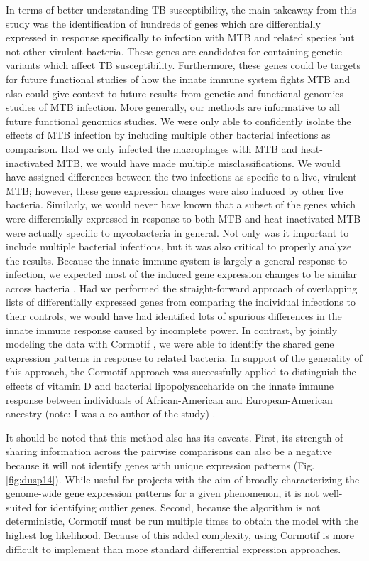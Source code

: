 In terms of better understanding TB susceptibility, the main takeaway from this
study was the identification of hundreds of genes which are differentially
expressed in response specifically to infection with MTB and related species but
not other virulent bacteria. These genes are candidates for containing genetic
variants which affect TB susceptibility. Furthermore, these genes could be
targets for future functional studies of how the innate immune system fights MTB
and also could give context to future results from genetic and functional
genomics studies of MTB infection. More generally, our methods are informative
to all future functional genomics studies. We were only able to confidently
isolate the effects of MTB infection by including multiple other bacterial
infections as comparison. Had we only infected the macrophages with MTB and
heat-inactivated MTB, we would have made multiple misclassifications. We would
have assigned differences between the two infections as specific to a live,
virulent MTB; however, these gene expression changes were also induced by other
live bacteria. Similarly, we would never have known that a subset of the genes
which were differentially expressed in response to both MTB and heat-inactivated
MTB were actually specific to mycobacteria in general. Not only was it important
to include multiple bacterial infections, but it was also critical to properly
analyze the results. Because the innate immune system is largely a general
response to infection, we expected most of the induced gene expression changes
to be similar across bacteria \citep{Huang2001, Boldrick2002, Nau2002, Jenner2005}.
Had we performed the straight-forward approach of
overlapping lists of differentially expressed genes from comparing the
individual infections to their controls, we would have had identified lots of
spurious differences in the innate immune response caused by incomplete
power. In contrast, by jointly modeling the data with Cormotif \citep{Wei2015}, we were able to
identify the shared gene expression patterns in response to related bacteria. In
support of the generality of this approach, the Cormotif approach was
successfully applied to distinguish the effects of vitamin D and bacterial
lipopolysaccharide on the innate immune response between individuals of
African-American and European-American ancestry (note: I was a co-author of the
study) \citep{Kariuki2016}.

It should be noted that this method also has its caveats. First, its strength of
sharing information across the pairwise comparisons can also be a negative
because it will not identify genes with unique expression patterns (Fig. \ref{fig:dusp14}). While useful
for projects with the aim of broadly characterizing the genome-wide gene
expression patterns for a given phenomenon, it is not well-suited for
identifying outlier genes. Second, because the algorithm is not deterministic,
Cormotif must be run multiple times to obtain the model with the highest log
likelihood. Because of this added complexity, using Cormotif is more difficult
to implement than more standard differential expression approaches.

